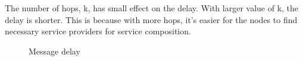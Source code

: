 The number of hops, k, has small effect on the delay. With larger value of k, the delay is shorter. This is because with more hops, it's easier for the nodes to find necessary service providers for service composition.

\begin{figure}
\centering
{}
\caption{Message delay}
\label{fig:lasecalg-exp-delay}
\end{figure}
